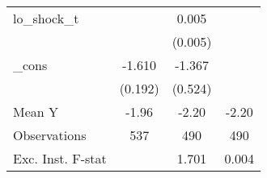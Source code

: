 {\begin{tabular}{l*{3}{c}}
\addlinespace
lo\_shock\_t  &                     &       0.005         &                     \\
            &                     &     (0.005)         &                     \\
\addlinespace
\_cons      &      -1.610\sym{***}&      -1.367\sym{**} &                     \\
            &     (0.192)         &     (0.524)         &                     \\
\midrule
Mean Y      &       -1.96         &       -2.20         &       -2.20         \\
Observations&         537         &         490         &         490         \\
Exc. Inst. F-stat&                     &       1.701         &       0.004         \\
\bottomrule
\end{tabular}
}
